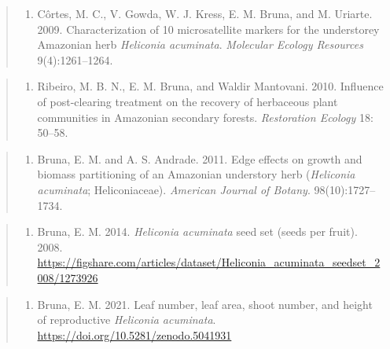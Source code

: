 \documentclass[
  man, donotrepeattitle,floatsintext]{apa6}
\providecommand{\tightlist}{%
  \setlength{\itemsep}{0pt}\setlength{\parskip}{0pt}}
\begin{document}
\begin{quote}
\begin{enumerate}
\def\labelenumi{\arabic{enumi}.}
\setcounter{enumi}{4}
\tightlist
\item
  Côrtes, M. C., V. Gowda, W. J. Kress, E. M. Bruna, and M. Uriarte. 2009. Characterization of 10 microsatellite markers for the understorey Amazonian herb \emph{Heliconia acuminata}. \emph{Molecular Ecology Resources} 9(4):1261--1264.
\end{enumerate}
\end{quote}

\begin{quote}
\begin{enumerate}
\def\labelenumi{\arabic{enumi}.}
\setcounter{enumi}{5}
\tightlist
\item
  Ribeiro, M. B. N., E. M. Bruna, and Waldir Mantovani. 2010. Influence of post-clearing treatment on the recovery of herbaceous plant communities in Amazonian secondary forests. \emph{Restoration Ecology} 18: 50--58.
\end{enumerate}
\end{quote}

\begin{quote}
\begin{enumerate}
\def\labelenumi{\arabic{enumi}.}
\setcounter{enumi}{6}
\tightlist
\item
  Bruna, E. M. and A. S. Andrade. 2011. Edge effects on growth and biomass partitioning of an Amazonian understory herb (\emph{Heliconia acuminata}; Heliconiaceae). \emph{American Journal of Botany}. 98(10):1727--1734.
\end{enumerate}
\end{quote}

\begin{quote}
\begin{enumerate}
\def\labelenumi{\arabic{enumi}.}
\setcounter{enumi}{7}
\tightlist
\item
  Bruna, E. M. 2014. \emph{Heliconia acuminata} seed set (seeds per fruit). 2008. \url{https://figshare.com/articles/dataset/Heliconia_acuminata_seedset_2008/1273926}
\end{enumerate}
\end{quote}

\begin{quote}
\begin{enumerate}
\def\labelenumi{\arabic{enumi}.}
\setcounter{enumi}{8}
\tightlist
\item
  Bruna, E. M. 2021. Leaf number, leaf area, shoot number, and height of reproductive \emph{Heliconia acuminata}. \url{https://doi.org/10.5281/zenodo.5041931}
\end{enumerate}
\end{quote}
\end{document}
